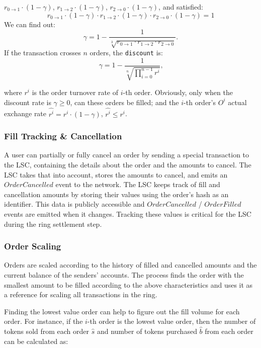 \documentclass[UTF8,nofonts]{article}
\begin{document}
\begin{multicols}{2}
$r_{0\rightarrow 1} \cdot (1-\gamma)$, $r_{1\rightarrow 2} \cdot (1-\gamma)$, $r_{2 \rightarrow 0} \cdot (1-\gamma)$, and satisfied: 
\begin{equation}
r_{0\rightarrow 1} \cdot (1-\gamma)\cdot r_{1\rightarrow 2} \cdot (1-\gamma) \cdot r_{2 \rightarrow 0} \cdot (1-\gamma) = 1
\end{equation}
We can find out: 
\begin{equation*}
\gamma = 1- \frac{1}{\sqrt[3]{r_{0\rightarrow 1} \cdot r_{1\rightarrow 2} \cdot r_{2\rightarrow 0}}}\text{.}
\end{equation*}
If the transaction crosses $n$ orders, the \texttt{discount} is: 
\begin{equation*}
\gamma = 1- \frac{1}{\sqrt[n]{\prod_{i=0}^{n-1} r^i}} \text{,}
\end{equation*}

where $r^i$ is the order turnover rate of $i$-th order. Obviously, only when the discount rate is $\gamma \ge 0$, can these orders be filled; and the $i$-th order's $O^i$ actual exchange rate $\hat{r^i} = r^i \cdot (1-\gamma)$, $\hat{r^i}\le r^i$.

\subsubsection{Fill Tracking \& Cancellation}
A user can partially or fully cancel an order by sending a special transaction to the LSC, containing the details about the order and the amounts to cancel. The LSC takes that into account, stores the amounts to cancel, and emits an $OrderCancelled$ event to the network. The LSC keeps track of fill and cancellation amounts by storing their values using the order's hash as an identifier. This data is publicly accessible and $OrderCancelled$ / $OrderFilled$ events are emitted when it changes. Tracking these values is critical for the LSC during the ring settlement step.


\subsubsection{Order Scaling\label{sec:order_scaling}}
Orders are scaled according to the history of filled and cancelled amounts and the current balance of the senders' accounts. The process finds the order with the smallest amount to be filled according to the above characteristics and uses it as a reference for scaling all transactions in the ring.


Finding the lowest value order can help to figure out the fill volume for each order. For instance, if the $i$-th order is the lowest value order, then the number of tokens sold from each order $\hat{s}$ and number of tokens purchased $\hat{b}$ from each order can be calculated as:


\end{multicols}
\end{document}
